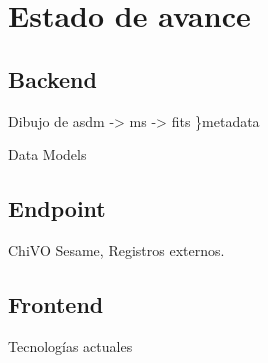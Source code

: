 \section{Estado de avance}
\subsection{Backend}
Dibujo de asdm -> ms -> fits \}metadata

Data Models

\subsection{Endpoint}
ChiVO Sesame, Registros externos.

\subsection{Frontend}
Tecnologías actuales
